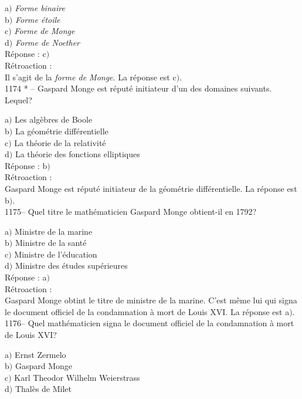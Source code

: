 ﻿\documentclass[letterpaper, 12pt]{article}
\begin{document}
a$)$ {\sl Forme binaire} \\
b$)$ {\sl Forme \'etoile} \\
c$)$ {\sl Forme de Monge} \\
d$)$ {\sl Forme de Noether}\\

R\'eponse : c$)$\\

R\'etroaction : \\
Il s'agit de la {\sl forme de Monge}.
La r\'eponse est c$)$.\\

1174 * -- Gaspard Monge est r\'eput\'e initiateur d'un des domaines
suivants. Lequel?

a$)$ Les alg\`ebres de Boole \\
b$)$ La g\'eom\'etrie diff\'erentielle \\
c$)$ La th\'eorie de la relativit\'e \\
d$)$ La th\'eorie des fonctions elliptiques\\

R\'eponse : b$)$\\

R\'etroaction : \\
Gaspard Monge est r\'eput\'e initiateur de la g\'eom\'etrie
diff\'erentielle.
La r\'eponse est b$)$.\\

1175-- Quel titre le math\'ematicien Gaspard Monge obtient-il en
1792?

a$)$ Ministre de la marine \\
b$)$ Ministre de la sant\'e \\
c$)$ Ministre de l'\'education  \\
d$)$ Ministre des \'etudes sup\'erieures\\

R\'eponse : a$)$\\

R\'etroaction : \\
Gaspard Monge obtint le titre de ministre de la marine. C'est m\^eme
lui qui signa le document officiel de la condamnation \`a mort de
Louis XVI.
La r\'eponse est a$)$.\\

1176-- Quel math\'ematicien signa le document officiel de la
condamnation \`a mort de Louis XVI?

a$)$ Ernst Zermelo \\
b$)$ Gaspard Monge \\
c$)$ Karl Theodor Wilhelm Weierstrass  \\
d$)$ Thal\`es de Milet\\
\end{document}
